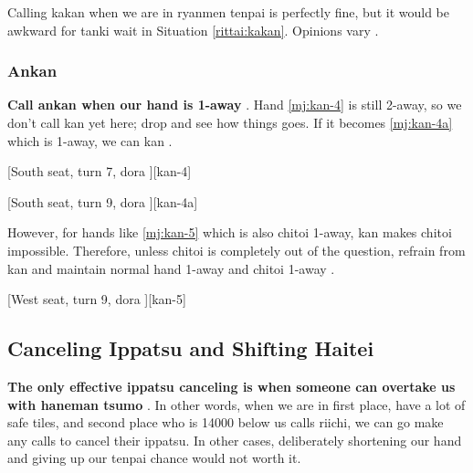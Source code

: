 \documentclass[12pt]{article}
\begin{document}
Calling kakan when we are in ryanmen tenpai is perfectly fine, but it would be awkward for tanki wait in Situation \ref{rittai:kakan}. Opinions vary \citep[][pp.~198--199, p.~222]{fkt}.

\begin{rittai}[h]
  \centering
  \caption{}
  \label{rittai:kakan}
\end{rittai}


\subsubsection*{Ankan}

\textbf{Call ankan when our hand is 1-away} \citep[][pp.153--157]{ooi-gundou}. Hand \ref{mj:kan-4} is still 2-away, so we don't call kan yet here; drop  and see how things goes. If it becomes \ref{mj:kan-4a} which is 1-away, we can kan .

[South seat, turn 7, dora ][kan-4]

[South seat, turn 9, dora ][kan-4a]

However, for hands like \ref{mj:kan-5} which is also chitoi 1-away, kan makes chitoi impossible. Therefore, unless chitoi is completely out of the question, refrain from kan and maintain normal hand 1-away and chitoi 1-away \citep[][pp.~163--164]{ooi-gundou}.

[West seat, turn 9, dora ][kan-5]


\subsection{Canceling Ippatsu and Shifting Haitei}

\textbf{The only effective ippatsu canceling is when someone can overtake us with haneman tsumo} \citep[][p.~188]{hirasawa-naki}. In other words, when we are in first place, have a lot of safe tiles, and second place who is 14000 below us calls riichi, we can go make any calls to cancel their ippatsu. In other cases, deliberately shortening our hand and giving up our tenpai chance would not worth it.
\end{document}
